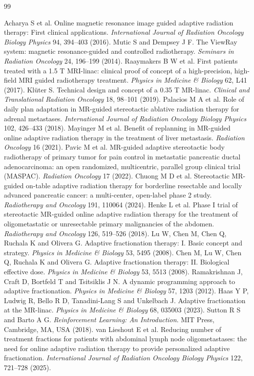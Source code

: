 \documentclass[11pt]{article}
\begin{document}
\begin{thebibliography}{99}

 Acharya S et al. Online magnetic resonance image guided adaptive radiation therapy: First clinical applications. \textit{International Journal of Radiation Oncology Biology Physics} 94, 394--403 (2016).
 Mutic S and Dempsey J F. The ViewRay system: magnetic resonance-guided and controlled radiotherapy. \textit{Seminars in Radiation Oncology} 24, 196--199 (2014).
 Raaymakers B W et al. First patients treated with a 1.5 T MRI-linac: clinical proof of concept of a high-precision, high-field MRI guided radiotherapy treatment. \textit{Physics in Medicine \& Biology} 62, L41 (2017).
 Kl\"uter S. Technical design and concept of a 0.35 T MR-linac. \textit{Clinical and Translational Radiation Oncology} 18, 98--101 (2019).
 Palacios M A et al. Role of daily plan adaptation in MR-guided stereotactic ablative radiation therapy for adrenal metastases. \textit{International Journal of Radiation Oncology Biology Physics} 102, 426--433 (2018).
 Mayinger M et al. Benefit of replanning in MR-guided online adaptive radiation therapy in the treatment of liver metastasis. \textit{Radiation Oncology} 16 (2021).
 Pavic M et al. MR-guided adaptive stereotactic body radiotherapy of primary tumor for pain control in metastatic pancreatic ductal adenocarcinoma: an open randomized, multicentric, parallel group clinical trial (MASPAC). \textit{Radiation Oncology} 17 (2022).
 Chuong M D et al. Stereotactic MR-guided on-table adaptive radiation therapy for borderline resectable and locally advanced pancreatic cancer: a multi-center, open-label phase 2 study. \textit{Radiotherapy and Oncology} 191, 110064 (2024).
 Henke L et al. Phase I trial of stereotactic MR-guided online adaptive radiation therapy for the treatment of oligometastatic or unresectable primary malignancies of the abdomen. \textit{Radiotherapy and Oncology} 126, 519--526 (2018).
 Lu W, Chen M, Chen Q, Ruchala K and Olivera G. Adaptive fractionation therapy: I. Basic concept and strategy. \textit{Physics in Medicine \& Biology} 53, 5495 (2008).
 Chen M, Lu W, Chen Q, Ruchala K and Olivera G. Adaptive fractionation therapy: II. Biological effective dose. \textit{Physics in Medicine \& Biology} 53, 5513 (2008).
 Ramakrishnan J, Craft D, Bortfeld T and Tsitsiklis J N. A dynamic programming approach to adaptive fractionation. \textit{Physics in Medicine \& Biology} 57, 1203 (2012).
 Haas Y P, Ludwig R, Bello R D, Tanadini-Lang S and Unkelbach J. Adaptive fractionation at the MR-linac. \textit{Physics in Medicine \& Biology} 68, 035003 (2023).
 Sutton R S and Barto A G. \textit{Reinforcement Learning: An Introduction}. MIT Press, Cambridge, MA, USA (2018).
 van Lieshout E et al. Reducing number of treatment fractions for patients with abdominal lymph node oligometastases: the need for online adaptive radiation therapy to provide personalized adaptive fractionation. \textit{International Journal of Radiation Oncology Biology Physics} 122, 721--728 (2025).

\end{thebibliography}
\end{document}
